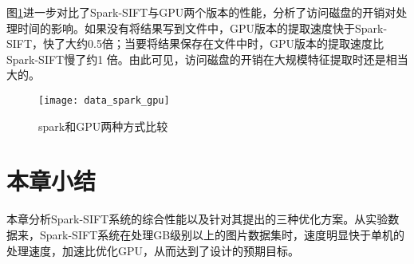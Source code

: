 图\ref{fig:data_spark_gpu}进一步对比了Spark-SIFT与GPU两个版本的性能，分析了访问磁盘的开销对处理时间的影响。如果没有将结果写到文件中，GPU版本的提取速度快于Spark-SIFT，快了大约0.5倍；当要将结果保存在文件中时，GPU版本的提取速度比Spark-SIFT慢了约1 倍。由此可见，访问磁盘的开销在大规模特征提取时还是相当大的。
\begin{figure}[htp]
\centering
\texttt{[image: data\_spark\_gpu]}
\caption{spark和GPU两种方式比较}
\label{fig:data_spark_gpu}
\end{figure}
\section{本章小结}
本章分析Spark-SIFT系统的综合性能以及针对其提出的三种优化方案。从实验数据来，Spark-SIFT系统在处理GB级别以上的图片数据集时，速度明显快于单机的处理速度，加速比优化GPU，从而达到了设计的预期目标。
